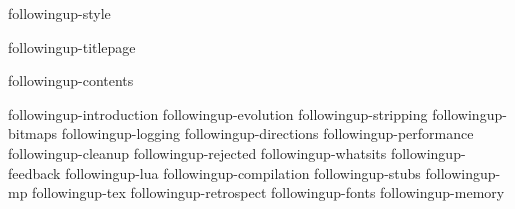 \environment followingup-style

\dontcomplain

\startdocument

    \component followingup-titlepage

    \startfrontmatter
        \component followingup-contents
    \stopfrontmatter

    \startbodymatter
        \component followingup-introduction
        \component followingup-evolution
        \component followingup-stripping
        \component followingup-bitmaps
        \component followingup-logging
        \component followingup-directions
        \component followingup-performance
        \component followingup-cleanup
        \component followingup-rejected
        \component followingup-whatsits
        \component followingup-feedback
        \component followingup-lua
        \component followingup-compilation
        \component followingup-stubs
        \component followingup-mp
        \component followingup-tex
        \component followingup-retrospect
        \component followingup-fonts
        \component followingup-memory
    \stopbodymatter

\stopdocument

